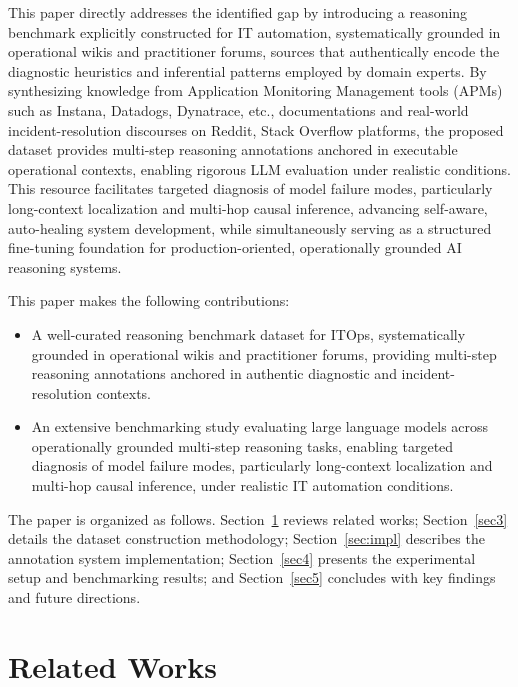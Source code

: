 \documentclass[11pt]{article}
\begin{document}
This paper directly addresses the identified gap by introducing a reasoning benchmark explicitly constructed for IT automation, systematically grounded in operational wikis and practitioner forums, sources that authentically encode the diagnostic heuristics and inferential patterns employed by domain experts. By synthesizing knowledge from Application Monitoring Management tools (APMs) such as Instana, Datadogs, Dynatrace, etc., documentations and real-world incident-resolution discourses on Reddit, Stack Overflow platforms, the proposed dataset provides multi-step reasoning annotations anchored in executable operational contexts, enabling rigorous LLM evaluation under realistic conditions. This resource facilitates targeted diagnosis of model failure modes, particularly long-context localization and multi-hop causal inference, advancing self-aware, auto-healing system development, while simultaneously serving as a structured fine-tuning foundation for production-oriented, operationally grounded AI reasoning systems.



This paper makes the following contributions:
\begin{itemize}
    \item A well-curated reasoning benchmark dataset for ITOps, systematically grounded in operational wikis and practitioner forums, providing multi-step reasoning annotations anchored in authentic diagnostic and incident-resolution contexts.
    \item An extensive benchmarking study evaluating large language models across operationally grounded multi-step reasoning tasks, enabling targeted diagnosis of model failure modes, particularly long-context localization and multi-hop causal inference, under realistic IT automation conditions.
\end{itemize}


The paper is organized as follows. Section~\ref{sec2} reviews related works; Section~\ref{sec3} details the dataset construction methodology; Section~\ref{sec:impl} describes the annotation system implementation; Section~\ref{sec4} presents the experimental setup and benchmarking results; and Section~\ref{sec5} concludes with key findings and future directions.

\section{Related Works}\label{sec2}
\end{document}
